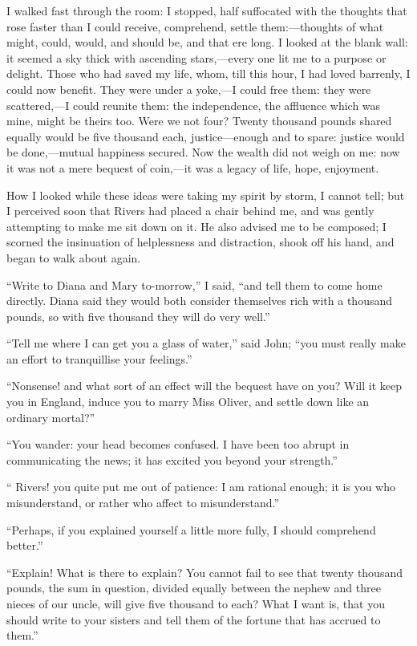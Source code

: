 I walked fast through the room: I stopped, half suffocated with the
thoughts that rose faster than I could receive, comprehend, settle
them:---thoughts of what might, could, would, and should be, and that
ere long. I looked at the blank wall: it seemed a sky thick with
ascending stars,---every one lit me to a purpose or delight. Those who
had saved my life, whom, till this hour, I had loved barrenly, I could
now benefit. They were under a yoke,---I could free them: they were
scattered,---I could reunite them: the independence, the affluence which
was mine, might be theirs too. Were we not four? Twenty thousand
pounds shared equally would be five thousand each, justice---enough and
to spare: justice would be done,---mutual happiness secured. Now the
wealth did not weigh on me: now it was not a mere bequest of coin,---it
was a legacy of life, hope, enjoyment.

How I looked while these ideas were taking my spirit by storm, I cannot
tell; but I perceived soon that \Mr{} Rivers had placed a chair behind me,
and was gently attempting to make me sit down on it. He also advised me
to be composed; I scorned the insinuation of helplessness and
distraction, shook off his hand, and began to walk about again.

\enquote{Write to Diana and Mary to-morrow,} I said, \enquote{and tell
	them to come home directly. Diana said they would both consider
	themselves rich with a thousand pounds, so with five thousand they will
	do very well.}

\enquote{Tell me where I can get you a glass of water,} said \St{} John;
\enquote{you must really make an effort to tranquillise your feelings.}

\enquote{Nonsense! and what sort of an effect will the bequest have on
	you? Will it keep you in England, induce you to marry Miss Oliver, and
	settle down like an ordinary mortal?}

\enquote{You wander: your head becomes confused. I have been too abrupt
	in communicating the news; it has excited you beyond your strength.}

\enquote{\Mr{} Rivers! you quite put me out of patience: I am rational
	enough; it is you who misunderstand, or rather who affect to
	misunderstand.}

\enquote{Perhaps, if you explained yourself a little more fully, I
	should comprehend better.}

\enquote{Explain! What is there to explain? You cannot fail to see
	that twenty thousand pounds, the sum in question, divided equally
	between the nephew and three nieces of our uncle, will give five
	thousand to each? What I want is, that you should write to your sisters
	and tell them of the fortune that has accrued to them.}

